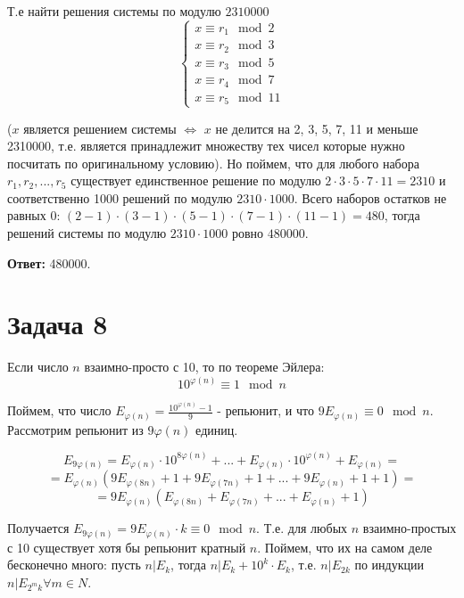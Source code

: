 \documentclass{article}
\begin{document}
			Т.е найти решения системы по модулю $2310000$
			\begin{equation*} 
			\begin{cases}
			x \equiv r_1 \mod 2 \\
			x \equiv r_2 \mod 3 \\
			x \equiv r_3 \mod 5 \\
			x \equiv r_4 \mod 7 \\
			x \equiv r_5 \mod 11
			\end{cases}
			\end{equation*}
			
			($x$ является решением системы $\Longleftrightarrow$ $x$ не делится на 2, 3, 5, 7, 11 и меньше 2310000, т.е. является принадлежит множеству тех чисел которые нужно посчитать по оригинальному условию). Но поймем, что для любого набора ${r_1, r_2, ..., r_5}$ существует единственное решение по модулю $2 \cdot 3 \cdot 5 \cdot 7 \cdot 11 = 2310$ и соответственно 1000 решений по модулю $2310 \cdot 1000$. Всего наборов остатков не равных 0: $ (2 - 1) \cdot (3 - 1) \cdot (5 - 1) \cdot (7 - 1) \cdot (11 - 1) = 480$, тогда решений системы по модулю $ 2310 \cdot 1000$ ровно $480000$.
		
		 \textbf{Ответ:} 480000.
		 
		 
		  \section {Задача 8}
		  
		  Если число $n$ взаимно-просто с 10, то по теореме Эйлера:
		  $$ 10^{\varphi(n)} \equiv 1 \mod n$$
		  
		  Поймем, что число $E_{\varphi(n)} = \frac{10^{\varphi(n)} - 1}{9}$ - репьюнит, и что $9E_{\varphi(n)} \equiv 0 \mod n$. Рассмотрим репьюнит из $9\varphi(n)$ единиц. 
		  
		  $$ E_{9\varphi(n)} = E_{\varphi(n)} \cdot 10^{8\varphi(n)} + ... + E_{\varphi(n)} \cdot 10^{\varphi(n)} + E_{\varphi(n)} = $$
		  $$=  E_{\varphi(n)} ( 9E_{\varphi(8n)} + 1 + 9E_{\varphi(7n)} + 1 + ... +  9E_{\varphi(n)} + 1 + 1) = $$
		  $$ = 9E_{\varphi(n)} (E_{\varphi(8n)} + E_{\varphi(7n)} + ... + E_{\varphi(n)} + 1)$$
		  
		  Получается $E_{9\varphi(n)} = 9E_{\varphi(n)} \cdot k \equiv 0 \mod n$. Т.е. для любых $n$ взаимно-простых с 10 существует хотя бы репьюнит кратный $n$. Поймем, что их на самом деле бесконечно много: пусть $n | E_k$, тогда $n | E_k + 10^k \cdot E_k$, т.е. $n | E_{2k}$ по индукции $n | E_{2^mk} \forall m \in N$.
		  
\end{document}
